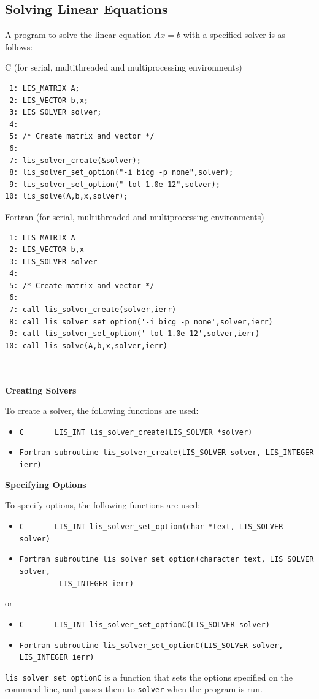 \documentclass[a4paper]{article}
\begin{document}
\subsection{Solving Linear Equations}\label{subsec:solve}
A program to solve the linear equation $Ax = b$ with a specified 
solver is as follows: 
\begin{itemsquarebox}[l]{C (for serial, multithreaded and multiprocessing environments)}
\small
\begin{verbatim}
 1: LIS_MATRIX A; 
 2: LIS_VECTOR b,x; 
 3: LIS_SOLVER solver; 
 4:    
 5: /* Create matrix and vector */ 
 6:    
 7: lis_solver_create(&solver); 
 8: lis_solver_set_option("-i bicg -p none",solver); 
 9: lis_solver_set_option("-tol 1.0e-12",solver); 
10: lis_solve(A,b,x,solver); 
\end{verbatim}
\end{itemsquarebox}
\begin{itemsquarebox}[l]{Fortran (for serial, multithreaded and multiprocessing environments)}
\small
\begin{verbatim}
 1: LIS_MATRIX A 
 2: LIS_VECTOR b,x 
 3: LIS_SOLVER solver 
 4:    
 5: /* Create matrix and vector */ 
 6:    
 7: call lis_solver_create(solver,ierr) 
 8: call lis_solver_set_option('-i bicg -p none',solver,ierr) 
 9: call lis_solver_set_option('-tol 1.0e-12',solver,ierr) 
10: call lis_solve(A,b,x,solver,ierr) 
\end{verbatim}
\end{itemsquarebox}
\\ \\
\noindent
{\bf Creating Solvers}

To create a solver, the following functions are used:
\begin{itemize}
\item \verb|C       LIS_INT lis_solver_create(LIS_SOLVER *solver)|
\item \verb|Fortran subroutine lis_solver_create(LIS_SOLVER solver, LIS_INTEGER ierr) |
\end{itemize}

\noindent
{\bf Specifying Options}

To specify options, 
the following functions are used:
\begin{itemize}
\item \verb|C       LIS_INT lis_solver_set_option(char *text, LIS_SOLVER solver)|
\item \verb|Fortran subroutine lis_solver_set_option(character text, LIS_SOLVER solver,|\\
      \verb|         LIS_INTEGER ierr)|
\end{itemize}
or
\begin{itemize}
\item \verb|C       LIS_INT lis_solver_set_optionC(LIS_SOLVER solver)|
\item \verb|Fortran subroutine lis_solver_set_optionC(LIS_SOLVER solver, LIS_INTEGER ierr)|
\end{itemize}
\verb|lis_solver_set_optionC| is a function that sets the options specified 
on the command line, and passes them to \verb|solver| when the program is run. 
\end{document}
